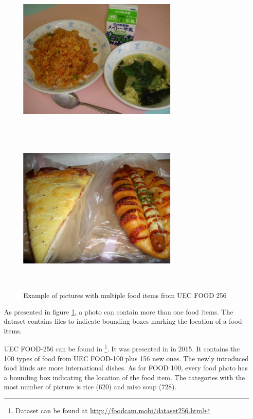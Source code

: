 \begin{figure}[h]
    \includegraphics[width=8cm, height=8cm]{img/multiple_food_items_3}
    \includegraphics[width=8cm, height=8cm]{img/multiple_food_items_4}
    \caption{Example of pictures with multiple food items from UEC FOOD 256}
    \label{fig:presentation_multiple_food_items}
\end{figure}

As presented in figure \ref{fig:presentation_multiple_food_items}, a photo can contain more than one food items. The dataset contains files to indicate bounding boxes marking the location of a food items.

UEC FOOD-256 can be found in \footnote{Dataset can be found at \url{http://foodcam.mobi/dataset256.html}}. It was presented in \cite{Kawano2015} in 2015. It contains  the 100 types of food from UEC FOOD-100 plus 156 new ones. The newly introduced food kinds are more international dishes. As for FOOD 100, every food photo has a bounding box indicating the location of the food item. The categories with the most number of picture is rice (620) and miso soup (728).